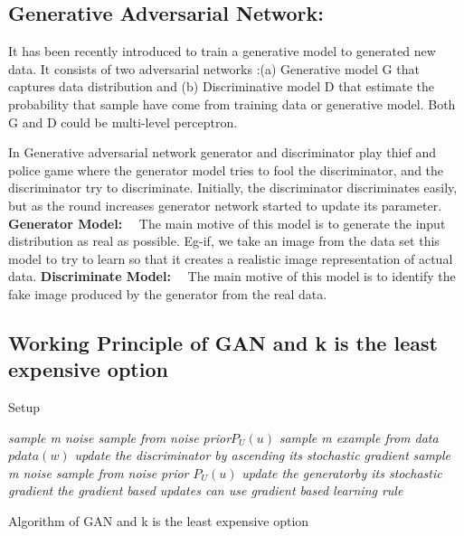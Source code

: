 \documentclass[runningheads]{llncs}
\begin{document}
\subsection{Generative Adversarial Network:} It has been recently introduced to train a generative model to generated new data. It consists of two adversarial networks :(a) Generative model G that captures data distribution and (b) Discriminative model D that estimate the probability that sample have come from training data or generative model. Both G and D could be multi-level perceptron. 

In Generative adversarial network generator and discriminator play thief and police game where the generator model tries to fool the discriminator, and the discriminator try to discriminate. Initially, the discriminator discriminates easily, but as the round increases generator network started to update its parameter.
\newline
\\
\textbf{Generator Model:}~~ The main motive of this model is to generate the input distribution as real as possible. Eg-if, we take an image from the data set this model to try to learn so that it creates a realistic image representation of actual data.
\newline
\textbf{Discriminate Model:}~~ The main motive of this model is to identify the fake image produced by the generator from the real data.
\newline
\hfill \break
\subsection{Working Principle of GAN and k is the least expensive option}
\begin{algorithm*}[H]
\caption{Setup}
\label{algo:pre}
\begin{algorithmic}[1]
    
            \STATE \emph{sample m noise sample from noise prior{$P_U(u)$}}
            \STATE \emph{sample m example from data  {$pdata(w)$}}
            \STATE \emph{update the discriminator by ascending its stochastic gradient}
        \ENDFOR
        \STATE \emph{sample m noise sample from noise prior ${P_U(u)}$}
        \STATE \emph{update the generatorby its stochastic gradient}
    \ENDFOR
    \STATE \emph{the gradient based updates can use gradient based learning rule}

 \caption{Algorithm of GAN and k is the least expensive option}    
\end{algorithmic}
\end{algorithm*}
\end{document}
